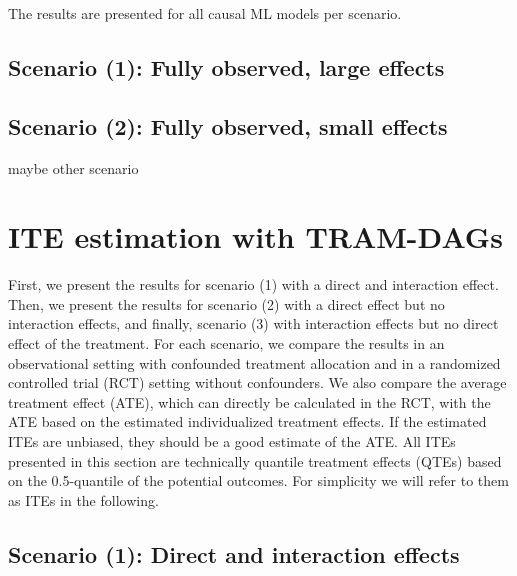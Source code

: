 The results are presented for all causal ML models per scenario.

\subsection{Scenario (1): Fully observed, large effects}

\subsection{Scenario (2): Fully observed, small effects}

maybe other scenario

\section{ITE estimation with TRAM-DAGs}

First, we present the results for scenario (1) with a direct and interaction effect. Then, we present the results for scenario (2) with a direct effect but no interaction effects, and finally, scenario (3) with interaction effects but no direct effect of the treatment. For each scenario, we compare the results in an observational setting with confounded treatment allocation and in a randomized controlled trial (RCT) setting without confounders. We also compare the average treatment effect (ATE), which can directly be calculated in the RCT, with the ATE based on the estimated individualized treatment effects. If the estimated ITEs are unbiased, they should be a good estimate of the ATE. All ITEs presented in this section are technically quantile treatment effects (QTEs) based on the 0.5-quantile of the potential outcomes. For simplicity we will refer to them as ITEs in the following.


\subsection{Scenario (1): Direct and interaction effects}

